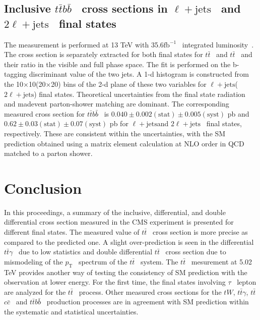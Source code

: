 \documentclass[submission, Proceedings]{SciPost}
\newcommand{\fbinv}{\ensuremath{{\text{fb}^{-1}}}{}}
\newcommand{\pt}{\ensuremath{{p_\text{T}}}}
\newcommand{\PQt}{\ensuremath{{t}}}
\newcommand{\PAQt}{\ensuremath{{\bar{t}}}}
\newcommand{\PQb}{\ensuremath{{b}}}
\newcommand{\PAQb}{\ensuremath{{\bar{b}}}}
\newcommand{\PQc}{\ensuremath{{c}}}
\newcommand{\PAQc}{\ensuremath{{\bar{c}}}}
\newcommand{\ttbar}{{\PQt\PAQt}}
\newcommand{\PW}{\ensuremath{{W}}}
\newcommand{\PQtau}{\ensuremath{{\tau}}}
\newcommand{\ljets}{\ensuremath{\ell + \text{jets}}}
\newcommand{\dilep}{\ensuremath{2\ell + \text{jets}}}
\newcommand{\ttgamma}{\ensuremath{\ttbar\gamma}}
\newcommand{\ttcc}{{\ttbar\PQc\PAQc}}
\newcommand{\ttbb}{{\ttbar\PQb\PAQb}}
\newcommand{\ttjj}{{\ttbar\text{jj}}}
\begin{document}
\subsection{Inclusive \ttbb~ cross sections in \ljets~ and \dilep~ final states}
The measurement is performed at 13 TeV with 35.6\fbinv~ integrated luminosity~\cite{CMS:2020grm}. 
The cross section is separately extracted for both final states for \ttbar~ and \ttjj~ and their ratio
in the visible and full phase space. The fit is performed on the b-tagging discriminant value of 
the two jets. A 1-d histogram is constructed from the 10×10(20×20) bins of the 2-d plane of these 
two variables for \ljets (\dilep) final states. Theoretical uncertainties from the final state
radiation and madevent parton-shower matching are dominant. The corresponding measured cross
section for \ttbb~ is $0.040 \pm 0.002 (\text{stat}) \pm 0.005 (\text{syst})$ pb and 
$0.62 \pm 0.03 (\text{stat}) \pm 0.07 (\text{syst})$ pb for \ljets and \dilep~ final states, 
respectively. These are consistent within the uncertainties, with the SM prediction obtained using 
a matrix element calculation at NLO order in QCD matched to a parton shower.
 

\section{Conclusion}
In this proceedings, a summary of the inclusive, differential, and double differential cross section
measured in the CMS experiment is presented for different final states. The measured value of 
\ttbar~ cross section is more precise as compared to the predicted one. A slight over-prediction
is seen in the differential \ttgamma~ due to low statistics and double differential \ttbar~ cross 
section due to mismodeling of the \pt~ spectrum of the \ttbar~ system. The \ttbar~ mesurement at
5.02 TeV provides another way of testing the consistency of SM prediction with the observation
at lower energy. For the first time, the final states involving \PQtau~ lepton are analyzed for the
\ttbar~ process. Other measured cross sections for the \PQt\PW, \ttgamma, \ttcc~ and \ttbb~ 
production processes are in agreement with SM prediction within the systematic and statistical 
uncertainties.
\end{document}
